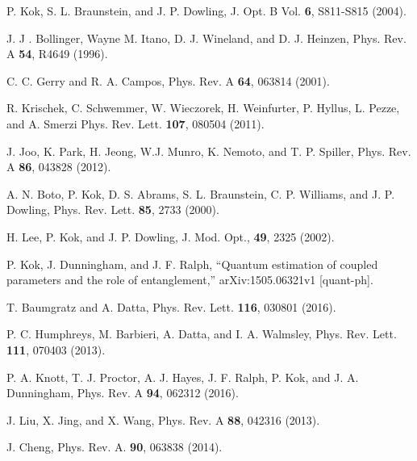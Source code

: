 \documentclass[aps,pra,reprint,showpacs,groupedaddress]{revtex4-1}
\begin{document}
\begin{thebibliography}{}
P. Kok, S. L. Braunstein, and J. P. Dowling,
J. Opt. B Vol. \textbf{6}, S811-S815 (2004).


J. J . Bollinger, Wayne M. Itano, D. J. Wineland, and D. J. Heinzen,
Phys. Rev. A \textbf{54}, R4649 (1996).




C. C. Gerry and R. A. Campos,
Phys. Rev. A \textbf{64}, 063814 (2001).


R. Krischek, C. Schwemmer, W. Wieczorek, H. Weinfurter, P. Hyllus, L. Pezze, and A. Smerzi
Phys. Rev. Lett. \textbf{107}, 080504 (2011).


J. Joo, K. Park, H. Jeong, W.J. Munro, K. Nemoto, and T. P. Spiller,
Phys. Rev. A \textbf{86}, 043828 (2012).

A. N. Boto, P. Kok, D. S. Abrams, S. L. Braunstein, C. P. Williams, and J. P. Dowling,
Phys. Rev. Lett. \textbf{85}, 2733 (2000).

H. Lee, P. Kok, and J. P. Dowling,
J. Mod. Opt., \textbf{49}, 2325 (2002).

P. Kok, J. Dunningham, and J. F. Ralph,
``Quantum estimation of coupled parameters and the role of entanglement,''
arXiv:1505.06321v1 [quant-ph].

T. Baumgratz and A. Datta,
Phys. Rev. Lett. \textbf{116}, 030801 (2016).


P. C. Humphreys, M. Barbieri, A. Datta, and I. A. Walmsley,
Phys. Rev. Lett. \textbf{111}, 070403 (2013).


P. A. Knott, T. J. Proctor, A. J. Hayes, J. F. Ralph, P. Kok, and J. A. Dunningham,
Phys. Rev. A \textbf{94}, 062312 (2016).


J. Liu, X. Jing, and X. Wang,
Phys. Rev. A \textbf{88}, 042316 (2013).



J. Cheng,
Phys. Rev. A. \textbf{90}, 063838 (2014).



\end{thebibliography}
\end{document}
